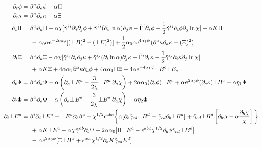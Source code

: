 \documentclass[prd]{revtex4}
\begin{document}
\begin{align}
\partial_t \phi &= \beta^a \partial_a \phi - \alpha \Pi \\
\partial_t \kappa &= \beta^a \partial_a \kappa - \alpha \Xi  \\
\partial_t \Pi &= \beta^a \partial_a \Pi - \alpha \chi [ \tilde{\gamma}^{ij} \partial_i \partial_j \phi +   \tilde{\gamma}^{ij} (\partial_i \ln \alpha) \partial_j \phi -  \tilde{\Gamma}^i \partial_i \phi - \frac{1}{2} \tilde{\gamma}^{ij} \partial_i \phi \partial_j \ln \chi ] + \alpha K \Pi  \nonumber \\
		   &\indent -\alpha_0 \alpha e^{-2 \alpha_0 \phi}  [ (\bot B)^2 - (\bot E)^2)] + \frac{1}{2} \alpha_0 \alpha e^{4 \alpha_1 \phi} (\partial^a \kappa \partial_a \kappa - (\Xi)^2)  \\
\partial_t \Xi &= \beta^a \partial_a \Xi - \alpha \chi [ \tilde{\gamma}^{ij} \partial_i \partial_j \kappa +   \tilde{\gamma}^{ij} (\partial_i \ln \alpha) \partial_j \kappa -  \tilde{\Gamma}^i \partial_i \kappa - \frac{1}{2} \tilde{\gamma}^{ij} \partial_i \kappa \partial_j \ln \chi ] \nonumber \\
&\indent +  \alpha K \Xi +4 \alpha \alpha_1 \partial^a \kappa \partial_a \phi + 4 \alpha \alpha_1 \Pi \Xi + 4 \alpha e^{-4 \alpha_1 \phi} \bot B^c \bot E_c \\
\partial_t \Psi &= \beta^a \partial_a \Psi - \alpha \left(\partial_a \bot E^a - \frac{3}{2 \chi}  \bot E^a \, \partial_a \chi \right) + 2 \alpha  \alpha_0 (\partial_c \phi) \bot E^c + \alpha  e^{2 \alpha_0 \phi} (\partial_c \kappa) \bot B^c  - \alpha \eta_1 \Psi \\
\partial_t \Phi &=  \beta^a \partial_a \Phi +\alpha \left(\partial_a \bot B^a - \frac{3}{2 \chi} \bot B^a \, \partial_a \chi  \right)  - \alpha  \eta_2 \Phi \\
\partial_t \bot E^a &= \beta^i \partial_i \bot E^a - \bot E^b \partial_b \beta^a - \chi^{1/2} \epsilon^{abc} \bigg \{ \alpha [\partial_b \tilde{\gamma}_{cd} \bot B^d + \tilde{\gamma}_{cd} \partial_b \bot B^d] + \tilde{\gamma}_{cd} \bot B^d \left[ \partial_b \alpha - \alpha \frac{\partial_b \chi}{\chi} \right] \bigg \} \nonumber \\
			    & \indent + \alpha K \bot E^a - \alpha \chi \tilde{\gamma}^{ab} \partial_b \Psi - 2 \alpha \alpha_0 [ \Pi \bot E^a - \epsilon^{abc} \chi^{1/2} \partial_b \phi \tilde{\gamma}_{cd} \bot B^d] \nonumber \\
			    & \indent - \alpha e^{2 \alpha_0 \phi} [ \Xi \bot B^a + \epsilon^{abc} \chi^{1/2} \partial_b K \tilde{\gamma}_{cd} E^d] \\

\end{align}
\end{document}
